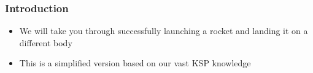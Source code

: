 \begin{frame}
    \frametitle{Introduction}
    \begin{block}{}
        \begin{itemize}
            \item We will take you through successfully launching a rocket and landing it on a different body
            \item This is a simplified version based on our vast KSP knowledge
        \end{itemize}
    \end{block}
\end{frame}
